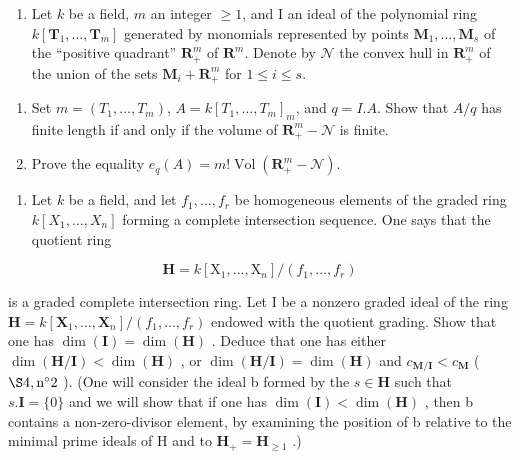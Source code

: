 \begin{enumerate}
\def\labelenumi{\arabic{enumi})}
\setcounter{enumi}{1}
\tightlist
\item
  Let \(k\) be a field, \(m\) an integer \(\geqslant 1\), and I an ideal of the polynomial ring \(k[\mathbf{T}_{1},\ldots,\mathbf{T}_{m}]\) generated by monomials represented by points \(\mathbf{M}_{1},\ldots,\mathbf{M}_{s}\) of the “positive quadrant” \(\mathbf{R}_{+}^{m}\) of \(\mathbf{R}^{m}\). Denote by \(\mathcal{N}\) the convex hull in \(\mathbf{R}_{+}^{m}\) of the union of the sets \(\mathbf{M}_{i}+\mathbf{R}_{+}^{m}\) for \(1\leqslant i\leqslant s\).
\end{enumerate}

\begin{enumerate}
\def\labelenumi{\alph{enumi})}
\tightlist
\item
  Set \(m = (T_1, \ldots, T_m)\), \(A = k[T_1, \ldots, T_m]_m\), and \(q = I.A\). Show that \(A/q\) has finite length if and only if the volume of \(\mathbf{R}_+^m - \mathcal{N}\) is finite.
\item
  Prove the equality \(e_q(A) = m! \operatorname{Vol}(\mathbf{R}_+^m - \mathcal{N})\).
\end{enumerate}

\begin{enumerate}
\def\labelenumi{\arabic{enumi})}
\setcounter{enumi}{2}
\tightlist
\item
  Let \(k\) be a field, and let \(f_{1},...,f_{r}\) be homogeneous elements of the graded ring \(k[X_{1},...,X_{n}]\) forming a complete intersection sequence. One says that the quotient ring
\end{enumerate}

\[
\mathbf {H} = k [ \mathrm{X} _ {1},..., \mathrm{X} _ {n} ] / (f _ {1},..., f _ {r})
\]

is a graded complete intersection ring. Let I be a nonzero graded ideal of the ring \(\mathbf{H} = k[\mathbf{X}_1, \ldots, \mathbf{X}_n] / (f_1, \ldots, f_r)\) endowed with the quotient grading. Show that one has \(\dim(\mathbf{I}) = \dim(\mathbf{H})\) . Deduce that one has either \(\dim(\mathbf{H}/\mathbf{I}) < \dim(\mathbf{H})\) , or \(\dim(\mathbf{H}/\mathbf{I}) = \dim(\mathbf{H})\) and \(c_{\mathbf{M}/\mathbf{I}} < c_{\mathbf{M}}\) ( \(\S 4, \text{n}^{\circ} 2\) ). (One will consider the ideal b formed by the \(s \in \mathbf{H}\) such that \(s.\mathbf{I} = \{0\}\) and we will show that if one has \(\dim(\mathbf{I}) < \dim(\mathbf{H})\) , then b contains a non-zero-divisor element, by examining the position of b relative to the minimal prime ideals of H and to \(\mathbf{H}_{+} = \mathbf{H}_{\geqslant 1}\) .)

